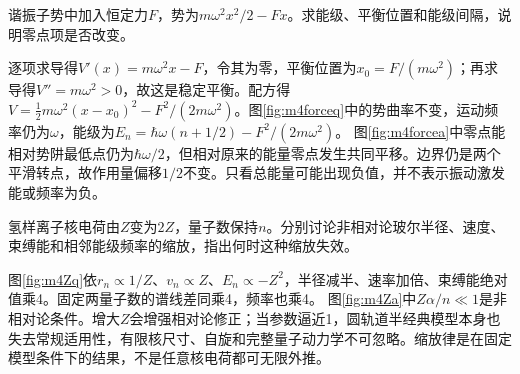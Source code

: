 \begin{exercise}\label{ex:m4oscforce}
谐振子势中加入恒定力$F$，势为$m\omega^2x^2/2-Fx$。求能级、平衡位置和能级间隔，说明零点项是否改变。
\end{exercise}
\begin{solution}
逐项求导得$V'(x)=m\omega^2x-F$，令其为零，平衡位置为$x_0=F/(m\omega^2)$；再求导得$V''=m\omega^2>0$，故这是稳定平衡。配方得$V=\tfrac12m\omega^2(x-x_0)^2-F^2/(2m\omega^2)$。图\ref{fig:m4forceq}中的势曲率不变，运动频率仍为$\omega$，能级为$E_n=\hbar\omega(n+1/2)-F^2/(2m\omega^2)$。
图\ref{fig:m4forcea}中零点能相对势阱最低点仍为$\hbar\omega/2$，但相对原来的能量零点发生共同平移。边界仍是两个平滑转点，故作用量偏移$1/2$不变。只看总能量可能出现负值，并不表示振动激发能或频率为负。
\end{solution}

\begin{exercise}\label{ex:m4hydrogenscaling}
氢样离子核电荷由$Z$变为$2Z$，量子数保持$n$。分别讨论非相对论玻尔半径、速度、束缚能和相邻能级频率的缩放，指出何时这种缩放失效。
\end{exercise}
\begin{solution}
图\ref{fig:m4Zq}依$r_n\propto1/Z$、$v_n\propto Z$、$E_n\propto-Z^2$，半径减半、速率加倍、束缚能绝对值乘4。固定两量子数的谱线差同乘4，频率也乘4。
图\ref{fig:m4Za}中$Z\alpha/n\ll1$是非相对论条件。增大$Z$会增强相对论修正；当参数逼近1，圆轨道半经典模型本身也失去常规适用性，有限核尺寸、自旋和完整量子动力学不可忽略。缩放律是在固定模型条件下的结果，不是任意核电荷都可无限外推。
\end{solution}
